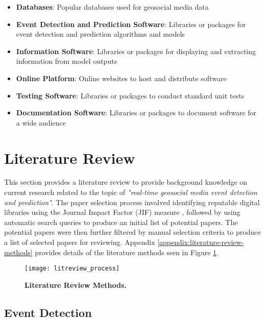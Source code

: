 \begin{itemize}
	\item \textbf{Databases}: Popular databases used for geosocial media data
	\item \textbf{Event Detection and Prediction Software}: Libraries or packages for event detection and prediction algorithms and models
	\item \textbf{Information Software}: Libraries or packages for displaying and extracting information from model outputs
	\item \textbf{Online Platform}: Online websites to host and distribute software
	\item \textbf{Testing Software}: Libraries or packages to conduct standard unit tests
	\item \textbf{Documentation Software}: Libraries or packages to document software for a wide audience
\end{itemize}




\section{Literature Review} \label{literature-review}

This section provides a literature review to provide background knowledge on current research related to the topic of \textit{"real-time geosocial media event detection and prediction"}. The paper selection process involved identifying reputable digital libraries using the Journal Impact Factor (JIF) measure \citep{Garfield:2006b}, followed by using automatic search queries to produce an initial list of potential papers. The potential papers were then further filtered by manual selection criteria to produce a list of selected papers for reviewing. Appendix \ref{appendix:literature-review-methods} provides details of the literature methods seen in Figure \ref{figure:litreview_process}.

\begin{figure}[!htb]
	\centering
	\texttt{[image: litreview\_process]}
	\caption{\textbf{Literature Review Methods.}}
	\label{figure:litreview_process}
\end{figure}

\subsection{Event Detection} \label{event-detection}

